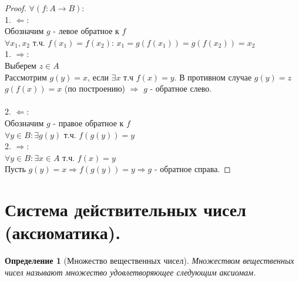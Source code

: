 \documentclass[12pt, a4]{article}
\newtheorem*{definition}{Определение}
\renewcommand{\implies}{\Rightarrow}
\newcommand{\bimplies}{\Leftarrow}
\begin{document}
\begin{proof}
$\forall (f: A \to B)$:\\
1.  $\bimplies$:\\
    Обозначим $g$ - левое обратное к $f$ \\
    $\forall x_1, x_2$ т.ч. $f(x_1) = f(x_2)$: $x_1 = g(f(x_1)) = g(f(x_2)) = x_2$ \\
1.  $\implies$:\\
    Выберем $z \in  A$ \\
    Рассмотрим $g(y) = x$, если $\exists x$ т.ч $f(x)=y$. В противном случае $g(y) = z$ \\
    $g(f(x)) = x$ (по построению) $\implies$ $g$ - обратное слево.\\
    \\
2.  $\bimplies$: \\
    Обозначим $g$ - правое обратное к $f$ \\
    $\forall y \in B: \exists g(y)$ т.ч. $f(g(y)) = y$\\
2.  $\implies$: \\
    $\forall y \in B: \exists x \in A$ т.ч. $f(x) = y$ \\
    Пусть $g(y) = x \implies f(g(y)) = y \implies g$ - обратное справа.  
    
    
\end{proof}

\section{Система действительных чисел (аксиоматика).}

\begin{definition}[Множество вещественных чисел]
Множеством вещественных чисел называют множество удовлетворяющее следующим аксиомам.
\end{definition}
\end{document}
